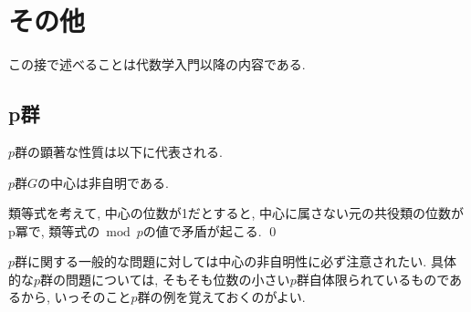 \section{その他}
この接で述べることは代数学入門以降の内容である.
\subsection{p群}
$p$群の顕著な性質は以下に代表される.
\begin{prop}
$p$群$G$の中心は非自明である.
\end{prop}
\prf
類等式を考えて, 中心の位数が1だとすると, 中心に属さない元の共役類の位数がp冪で, 類等式の$\bmod{p}$の値で矛盾が起こる.
\qed

$p$群に関する一般的な問題に対しては中心の非自明性に必ず注意されたい. 具体的な$p$群の問題については, そもそも位数の小さい$p$群自体限られているものであるから, いっそのこと$p$群の例を覚えておくのがよい.
